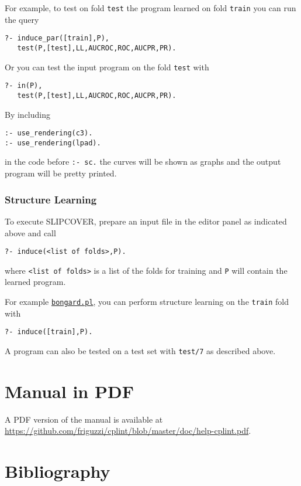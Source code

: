 \documentclass[a4paper,10pt]{scrartcl}
\begin{document}
For example, to test on fold \verb|test| the program learned on fold \verb|train| you can run the query
\begin{verbatim}
?- induce_par([train],P),
   test(P,[test],LL,AUCROC,ROC,AUCPR,PR).
\end{verbatim}
Or you can test the input program on the fold \verb|test| with
\begin{verbatim}
?- in(P),
   test(P,[test],LL,AUCROC,ROC,AUCPR,PR).
\end{verbatim}
By including
\begin{verbatim}
:- use_rendering(c3).
:- use_rendering(lpad).
\end{verbatim}
in the code before \verb|:- sc.| the curves will be shown as graphs and the output program will be pretty printed.



\subsubsection{Structure Learning}
To execute SLIPCOVER,
prepare an input file in the editor panel as indicated above 
and call
\begin{verbatim}
?- induce(<list of folds>,P).
\end{verbatim}
where \verb|<list of folds>| is a list of the folds for training and
\verb|P| will contain the learned program.

For example \href{http://cplint.lamping.unife.it/example/bongard.pl}{\texttt{bongard.pl}}, you can perform structure learning on the \verb|train| fold with 
\begin{verbatim}
?- induce([train],P).
\end{verbatim}
A program can also be tested on a test set with \verb|test/7| as
described above.



\section{Manual in PDF}
A PDF version of the manual is available at
\url{https://github.com/friguzzi/cplint/blob/master/doc/help-cplint.pdf}.
\section{Bibliography}


\end{document}
